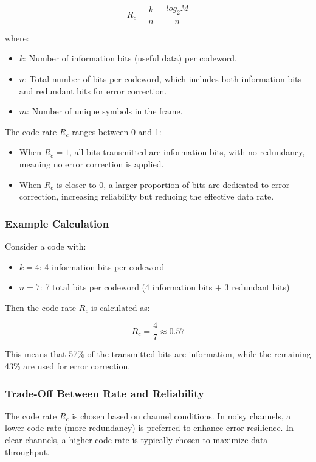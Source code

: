 \documentclass[10pt]{article}
\begin{document}
\[
    R_c = \frac{k}{n} = \frac{log_2{M}}{n}
\]

where:
\begin{itemize}
    \item \( k \): Number of information bits (useful data) per codeword.
    \item \( n \): Total number of bits per codeword, which includes both information bits and redundant bits for error correction.
    \item $m$: Number of unique symbols in the frame.
\end{itemize}

\noindent The code rate \( R_c \) ranges between 0 and 1:
\begin{itemize}
    \item When \( R_c = 1 \), all bits transmitted are information bits, with no redundancy, meaning no error correction is applied.
    \item When \( R_c \) is closer to 0, a larger proportion of bits are dedicated to error correction, increasing reliability but reducing the effective data rate.
\end{itemize}

\subsubsection{Example Calculation}

Consider a code with:
\begin{itemize}
    \item \( k = 4 \): 4 information bits per codeword
    \item \( n = 7 \): 7 total bits per codeword (4 information bits + 3 redundant bits)
\end{itemize}

Then the code rate \( R_c \) is calculated as:

\[
R_c = \frac{4}{7} \approx 0.57
\]

This means that 57\% of the transmitted bits are information, while the remaining 43\% are used for error correction.

\subsubsection{Trade-Off Between Rate and Reliability}

The code rate \( R_c \) is chosen based on channel conditions. In noisy channels, a lower code rate (more redundancy) is preferred to enhance error resilience. In clear channels, a higher code rate is typically chosen to maximize data throughput.
\end{document}
